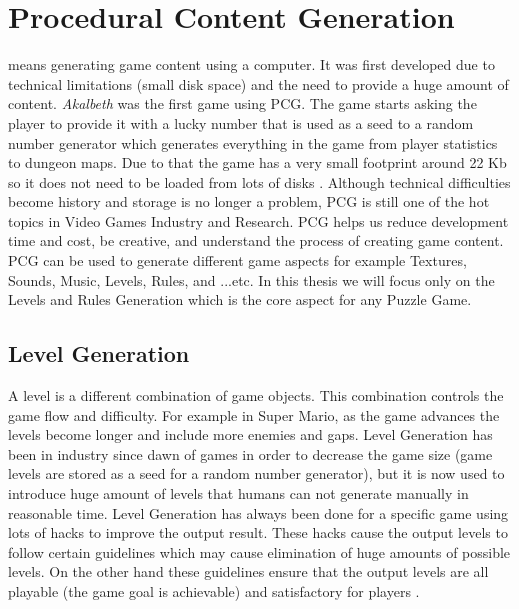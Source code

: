 \section{Procedural Content Generation}
 means generating game content using a computer. It was first developed due to technical limitations (small disk space) and the need to provide a huge amount of content. \emph{Akalbeth} was the first game using PCG. The game starts asking the player to provide it with a lucky number that is used as a seed to a random number generator which generates everything in the game from player statistics to dungeon maps. Due to that the game has a very small footprint around 22 Kb so it does not need to be loaded from lots of disks \cite{pcgFirstGame}. Although technical difficulties become history and storage is no longer a problem, PCG is still one of the hot topics in Video Games Industry and Research. PCG helps us reduce development time and cost, be creative, and understand the process of creating game content. PCG can be used to generate different game aspects for example Textures, Sounds, Music, Levels, Rules, and ...etc. In this thesis we will focus only on the Levels and Rules Generation which is the core aspect for any Puzzle Game.

\subsection{Level Generation}
A level is a different combination of game objects. This combination controls the game flow and difficulty. For example in Super Mario, as the game advances the levels become longer and include more enemies and gaps. Level Generation has been in industry since dawn of games in order to decrease the game size (game levels are stored as a seed for a random number generator), but it is now used to introduce huge amount of levels that humans can not generate manually in reasonable time. Level Generation has always been done for a specific game using lots of hacks to improve the output result. These hacks cause the output levels to follow certain guidelines which may cause elimination of huge amounts of possible levels. On the other hand these guidelines ensure that the output levels are all playable (the game goal is achievable) and satisfactory for players \cite{mcGenerateEverything}.

